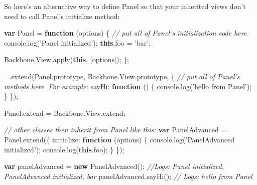\documentclass[9pt]{book}
\newenvironment{Shaded}{}{}
\newcommand{\KeywordTok}[1]{\textcolor[rgb]{0.00,0.44,0.13}{\textbf{{#1}}}}
\newcommand{\DataTypeTok}[1]{\textcolor[rgb]{0.56,0.13,0.00}{{#1}}}
\newcommand{\StringTok}[1]{\textcolor[rgb]{0.25,0.44,0.63}{{#1}}}
\newcommand{\CommentTok}[1]{\textcolor[rgb]{0.38,0.63,0.69}{\textit{{#1}}}}
\newcommand{\OtherTok}[1]{\textcolor[rgb]{0.00,0.44,0.13}{{#1}}}
\newcommand{\FunctionTok}[1]{\textcolor[rgb]{0.02,0.16,0.49}{{#1}}}
\newcommand{\NormalTok}[1]{{#1}}
\begin{document}
So here's an alternative way to define Panel so that your inherited
views don't need to call Panel's initialize method:

\begin{Shaded}
\begin{Highlighting}[]
\KeywordTok{var} \NormalTok{Panel = }\KeywordTok{function} \NormalTok{(options) \{}
  \CommentTok{// put all of Panel's initialization code here}
  \OtherTok{console}\NormalTok{.}\FunctionTok{log}\NormalTok{(}\StringTok{'Panel initialized'}\NormalTok{);}
  \KeywordTok{this}\NormalTok{.}\FunctionTok{foo} \NormalTok{= }\StringTok{'bar'}\NormalTok{;}

  \OtherTok{Backbone}\NormalTok{.}\OtherTok{View}\NormalTok{.}\FunctionTok{apply}\NormalTok{(}\KeywordTok{this}\NormalTok{, [options]);}
\NormalTok{\};}

\OtherTok{_}\NormalTok{.}\FunctionTok{extend}\NormalTok{(}\OtherTok{Panel}\NormalTok{.}\FunctionTok{prototype}\NormalTok{, }\OtherTok{Backbone}\NormalTok{.}\OtherTok{View}\NormalTok{.}\FunctionTok{prototype}\NormalTok{, \{}
  \CommentTok{// put all of Panel's methods here. For example:}
  \DataTypeTok{sayHi}\NormalTok{: }\KeywordTok{function} \NormalTok{() \{}
    \OtherTok{console}\NormalTok{.}\FunctionTok{log}\NormalTok{(}\StringTok{'hello from Panel'}\NormalTok{);}
  \NormalTok{\}}
\NormalTok{\});}

\OtherTok{Panel}\NormalTok{.}\FunctionTok{extend} \NormalTok{= }\OtherTok{Backbone}\NormalTok{.}\OtherTok{View}\NormalTok{.}\FunctionTok{extend}\NormalTok{;}

\CommentTok{// other classes then inherit from Panel like this:}
\KeywordTok{var} \NormalTok{PanelAdvanced = }\OtherTok{Panel}\NormalTok{.}\FunctionTok{extend}\NormalTok{(\{}
  \DataTypeTok{initialize}\NormalTok{: }\KeywordTok{function} \NormalTok{(options) \{}
    \OtherTok{console}\NormalTok{.}\FunctionTok{log}\NormalTok{(}\StringTok{'PanelAdvanced initialized'}\NormalTok{);}
    \OtherTok{console}\NormalTok{.}\FunctionTok{log}\NormalTok{(}\KeywordTok{this}\NormalTok{.}\FunctionTok{foo}\NormalTok{);}
  \NormalTok{\}}
\NormalTok{\});}

\KeywordTok{var} \NormalTok{panelAdvanced = }\KeywordTok{new} \FunctionTok{PanelAdvanced}\NormalTok{(); }\CommentTok{//Logs: Panel initialized, PanelAdvanced initialized, bar}
\OtherTok{panelAdvanced}\NormalTok{.}\FunctionTok{sayHi}\NormalTok{(); }\CommentTok{// Logs: hello from Panel}
\end{Highlighting}
\end{Shaded}
\end{document}
